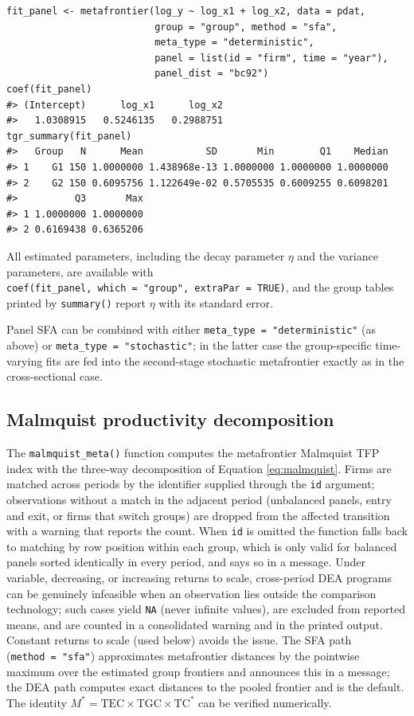 \begin{verbatim}
fit_panel <- metafrontier(log_y ~ log_x1 + log_x2, data = pdat,
                          group = "group", method = "sfa",
                          meta_type = "deterministic",
                          panel = list(id = "firm", time = "year"),
                          panel_dist = "bc92")
coef(fit_panel)
#> (Intercept)      log_x1      log_x2 
#>   1.0308915   0.5246135   0.2988751
tgr_summary(fit_panel)
#>   Group   N      Mean           SD       Min        Q1    Median
#> 1    G1 150 1.0000000 1.438968e-13 1.0000000 1.0000000 1.0000000
#> 2    G2 150 0.6095756 1.122649e-02 0.5705535 0.6009255 0.6098201
#>          Q3       Max
#> 1 1.0000000 1.0000000
#> 2 0.6169438 0.6365206
\end{verbatim}

All estimated parameters, including the decay parameter \(\eta\) and the
variance parameters, are available with
\texttt{coef(fit\_panel,\ which\ =\ "group",\ extraPar\ =\ TRUE)}, and the group tables
printed by \texttt{summary()} report \(\eta\) with its standard error.

Panel SFA can be combined with either \texttt{meta\_type\ =\ "deterministic"} (as
above) or \texttt{meta\_type\ =\ "stochastic"}; in the latter case the group-specific
time-varying fits are fed into the second-stage stochastic metafrontier
exactly as in the cross-sectional case.

\subsection{Malmquist productivity decomposition}\label{sec:malmquist-usage}

The \texttt{malmquist\_meta()} function computes the metafrontier Malmquist TFP index
with the three-way decomposition of Equation \eqref{eq:malmquist}. Firms are matched
across periods by the identifier supplied through the \texttt{id} argument;
observations without a match in the adjacent period (unbalanced panels,
entry and exit, or firms that switch groups) are dropped from the affected
transition with a warning that reports the count. When \texttt{id} is omitted the
function falls back to matching by row position within each group, which is
only valid for balanced panels sorted identically in every period, and says
so in a message. Under variable, decreasing, or increasing returns to
scale, cross-period DEA programs can be genuinely infeasible when an
observation lies outside the comparison technology; such cases yield \texttt{NA}
(never infinite values), are excluded from reported means, and are counted
in a consolidated warning and in the printed output. Constant returns to
scale (used below) avoids the issue. The SFA path (\texttt{method\ =\ "sfa"})
approximates metafrontier distances by the pointwise maximum over the
estimated group frontiers and announces this in a message; the DEA path
computes exact distances to the pooled frontier and is the default. The
identity \(M^* = \text{TEC} \times \text{TGC} \times \text{TC}^*\) can be
verified numerically.

